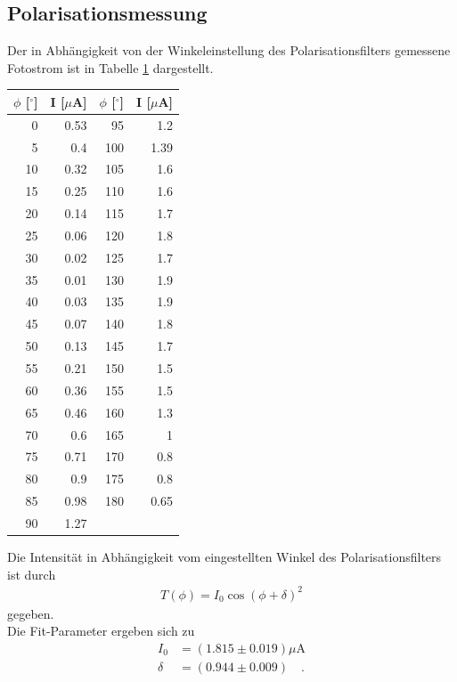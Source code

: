 \documentclass[captions=tableheading]{scrartcl}
\begin{document}
\subsection{Polarisationsmessung}
Der in Abhängigkeit von der Winkeleinstellung des Polarisationsfilters gemessene Fotostrom ist in Tabelle \ref{tab:polarisation} dargestellt.
\begin{table}
	\centering
	\label{tab:polarisation}
	\begin{tabular}{r r r r}
	\toprule $\phi$ [$^{\circ}$] & I [$\mu$A] & $\phi$ [$^{\circ}$] & I [$\mu$A]\\
	\midrule 0	&	0.53	&	95	&	1.2	\\
		   5	&	0.4	&	100	&	1.39	\\
	   	  10	&	0.32	&	105	&	1.6	\\
		  15	&	0.25	&	110	&	1.6	\\
	   	  20	&	0.14	&	115	&	1.7	\\
		  25	&	0.06	&	120	&	1.8	\\
		  30	&	0.02	&	125	&	1.7	\\
		  35	&	0.01	&	130	&	1.9	\\
		  40	&	0.03	&	135	&	1.9	\\
		  45	&	0.07	&	140	&	1.8	\\
		  50	&	0.13	&	145	&	1.7	\\
		  55	&	0.21	&	150	&	1.5	\\
		  60	&	0.36	&	155	&	1.5	\\
		  65	&	0.46	&	160	&	1.3	\\
		  70	&	0.6	&	165	&	1	\\
		  75	&	0.71	&	170	&	0.8	\\
		  80	&	0.9	&	175	&	0.8	\\
		  85	&	0.98	&	180	&	0.65	\\
		  90	&	1.27	&		&		\\				
	\bottomrule
		\end{tabular}
\end{table}
Die Intensität in Abhängigkeit vom eingestellten Winkel des Polarisationsfilters ist durch 
\begin{align}
T(\phi)=I_0\cos\left(\phi+\delta\right)^2
\end{align}
gegeben. \\
Die Fit-Parameter ergeben sich zu
\begin{align*}
I_0&=(1.815 \pm 0.019)\si{\mu\ampere} \\
\delta&=(0.944 \pm 0.009)\quad.
\end{align*}
\end{document}
